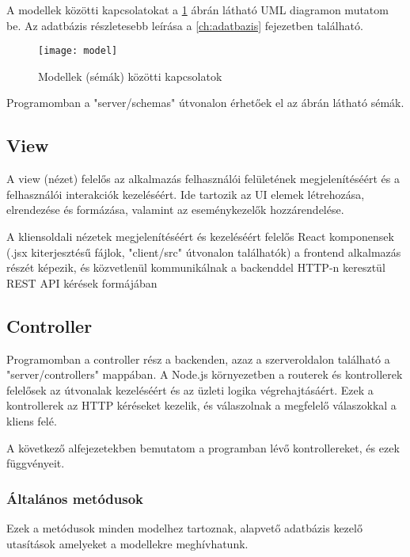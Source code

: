 A modellek közötti kapcsolatokat a \ref{fig:model} ábrán látható UML diagramon mutatom be.
Az adatbázis részletesebb leírása a \ref{ch:adatbazis} fejezetben található. 

\begin{figure}[H]
	\centering
	\texttt{[image: model]}
	\caption{Modellek (sémák) közötti kapcsolatok}
	\label{fig:model}
\end{figure}

Programomban a "server/schemas" útvonalon érhetőek el az ábrán látható sémák.

\subsection{View}

A view (nézet) felelős az alkalmazás felhasználói felületének megjelenítéséért és a felhasználói interakciók kezeléséért. Ide tartozik az UI elemek létrehozása, elrendezése és formázása, valamint az eseménykezelők hozzárendelése.

A kliensoldali nézetek megjelenítéséért és kezeléséért felelős React komponensek (.jsx kiterjesztésű fájlok, "client/src" útvonalon találhatók) a frontend alkalmazás részét képezik, és közvetlenül kommunikálnak a backenddel HTTP-n keresztül REST API kérések formájában

\subsection{Controller}

Programomban a controller rész a backenden, azaz a szerveroldalon található a "server/controllers" mappában. A Node.js környezetben a routerek és kontrollerek felelősek az útvonalak kezeléséért és az üzleti logika végrehajtásáért. Ezek a kontrollerek az HTTP kéréseket kezelik, és válaszolnak a megfelelő válaszokkal a kliens felé.

A következő alfejezetekben bemutatom a programban lévő kontrollereket, és ezek függvényeit. 

\subsubsection{Általános metódusok}

Ezek a metódusok minden modelhez tartoznak, alapvető adatbázis kezelő utasítások amelyeket a modellekre meghívhatunk.

